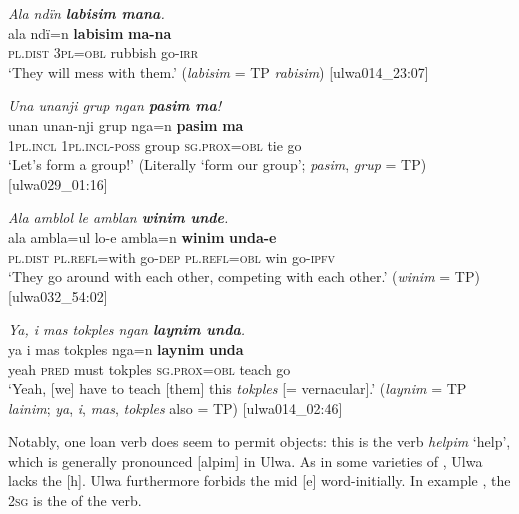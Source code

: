 \ea%
    \label{ex:loss:24}
          \textit{Ala ndïn \textbf{labisim mana}.}\\
\gll ala      ndï=n    \textbf{labisim}  \textbf{ma-na}\\
    \textsc{pl.dist}  \textsc{3pl=obl}  rubbish  go-\textsc{irr}\\
\glt `They will mess with them.’ (\textit{labisim} = TP \textit{rabisim}) [ulwa014\_23:07]
\z

\ea%
    \label{ex:loss:25}
          \textit{Una unanji grup ngan \textbf{pasim ma}!}\\
\gll    unan    unan-nji      grup  nga=n      \textbf{pasim}  \textbf{ma}\\
    1\textsc{pl.incl}  \textsc{1pl.incl-poss}    group  \textsc{sg.prox=obl}  tie    go\\
\glt `Let’s form a group!’ (Literally `form our group’; \textit{pasim}, \textit{grup} = TP) [ulwa029\_01:16]
\z

\ea%
    \label{ex:loss:26}
          \textit{Ala amblol le amblan \textbf{winim unde}.}\\
\gll ala      ambla=ul    lo-e  ambla=n    \textbf{winim}  \textbf{unda-e}\\
    \textsc{pl.dist}  \textsc{pl.refl=}with  go-\textsc{dep}  \textsc{pl.refl=obl}  win  go-\textsc{ipfv}\\
\glt `They go around with each other, competing with each other.’ (\textit{winim} = TP) [ulwa032\_54:02]
\z

\ea%
    \label{ex:loss:27}
          \textit{Ya, i mas tokples ngan \textbf{laynim unda}.}\\
\gll ya    i    mas  tokples  nga=n      \textbf{laynim}  \textbf{unda}\\
    yeah  \textsc{pred}  must  tokples  \textsc{sg.prox=obl}  teach  go\\
\glt `Yeah, [we] have to teach [them] this \textit{tokples} [= vernacular].’ (\textit{laynim} = TP \textit{lainim}; \textit{ya}, \textit{i}, \textit{mas}, \textit{tokples} also = TP) [ulwa014\_02:46]
\z

Notably, one  loan verb does seem to permit objects: this is the  verb \textit{helpim} ‘help’, which is generally pronounced [alpim] in Ulwa. As in some varieties of , Ulwa lacks the   [h]. Ulwa furthermore forbids the  mid  [e] word-initially. In example , the 2\textsc{sg}  is the  of the verb.

